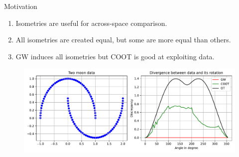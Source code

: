 \documentclass{beamer}
\begin{document}
\begin{frame}{Motivation}
\scriptsize

\vspace{-0.5cm}
\begin{enumerate}
  \item Isometries are useful for across-space comparison.
  \item All isometries are created equal, but some are more equal than others.
  \item GW induces all isometries but COOT is good at exploiting data.
\end{enumerate}
\begin{figure}
    \centering
    \includegraphics[width=1.\linewidth, keepaspectratio=true]{OT_new/div_vs_angle.pdf}
\end{figure}



\end{frame}
\end{document}
